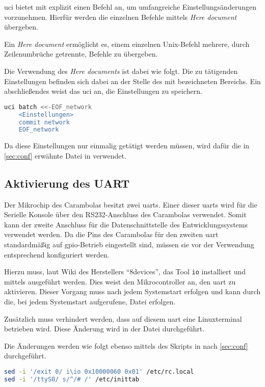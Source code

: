 \gls{uci} bietet mit  explizit einen Befehl an, um
umfangreiche Einstellungsänderungen vorzunehmen. Hierfür werden die einzelnen
Befehle mittels \emph{Here document} übergeben.

\begin{definition}
Ein \emph{Here document} ermöglicht es, einem einzelnen Unix-Befehl mehrere,
durch Zeilenumbrüche getrennte, Befehle zu übergeben.
\end{definition}
Die Verwendung des \emph{Here documents} ist dabei wie folgt. Die zu tätigenden
Einstellungen befinden sich dabei an der Stelle des mit
 bezeichneten Bereichs. Ein abschließendes
 weist das \gls{uci} an, die Einstellungen zu
speichern.
 \begin{lstlisting}[language=sh]
uci batch <<-EOF_network
	<Einstellungen>
	commit network
	EOF_network
\end{lstlisting}
Da diese Einstellungen nur einmalig getätigt werden müssen, wird dafür die in
\autoref{sec:conf} erwähnte Datei in  verwendet.

\subsection{Aktivierung des UART}\label{subs:aktuart}
Der Mikrochip\cite{RA01} des Carambolas besitzt zwei \glspl{uart}. Einer dieser
\glspl{uart} wird für die Serielle Konsole über den RS232-Anschluss des
Carambolas verwendet. Somit kann der zweite Anschluss für die
Datenschnittstelle des Entwicklungssystems verwendet werden.
Da die Pins des Carambolas für den zweiten \gls{uart} standardmäßig auf
\gls{gpio}-Betrieb eingestellt sind, müssen sie vor der Verwendung entsprechend
konfiguriert werden.

Hierzu muss, laut Wiki des Herstellers "`8devices"'\cite{CARAM1}, das Tool
\texttt{io} installiert und mittels  ausgeführt werden. Dies
weist den Mikrocontroller an, den \gls{uart} zu aktivieren. Dieser Vorgang muss
nach jedem Systemstart erfolgen und kann durch die, bei jedem Systemstart
aufgerufene, Datei  erfolgen.

Zusätzlich muss verhindert werden, dass auf diesem \gls{uart} eine Linuxterminal
betrieben wird. Diese Änderung wird in der Datei 
durchgeführt.

Die Änderungen werden wie folgt ebenso mittels des Skripts in
 nach \autoref{sec:conf} durchgeführt.
\begin{lstlisting}[language=sh]
sed -i '/exit 0/ i\io 0x10000060 0x01' /etc/rc.local
sed -i '/ttyS0/ s/^/# /' /etc/inittab
\end{lstlisting}


